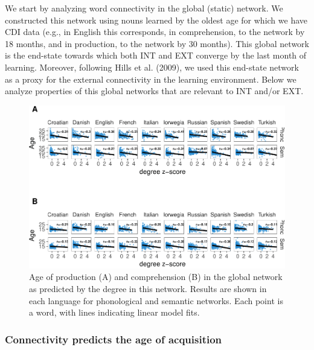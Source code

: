 \documentclass[english,floatsintext,man]{apa6}
\theoremstyle{definition}
\theoremstyle{definition}
\theoremstyle{definition}
\theoremstyle{remark}
\begin{document}
We start by analyzing word connectivity in the global (static) network.
We constructed this network using nouns learned by the oldest age for
which we have CDI data (e.g., in English this corresponds, in
comprehension, to the network by 18 months, and in production, to the
network by 30 months). This global network is the end-state towards
which both INT and EXT converge by the last month of learning. Moreover,
following Hills et al. (2009), we used this end-state network as a proxy
for the external connectivity in the learning environment. Below we
analyze properties of this global networks that are relevant to INT
and/or EXT.

\begin{figure}[!h]
\includegraphics[width=\textwidth]{ms_files/figure-latex/corrAll-1} \caption{Age of production (A) and comprehension (B) in the global network as predicted by the degree in this network. Results are shown in each language for phonological and semantic networks. Each point is a word, with lines indicating linear model fits.}\label{fig:corrAll}
\end{figure}

\subsubsection{Connectivity predicts the age of
acquisition}\label{connectivity-predicts-the-age-of-acquisition}
\end{document}
